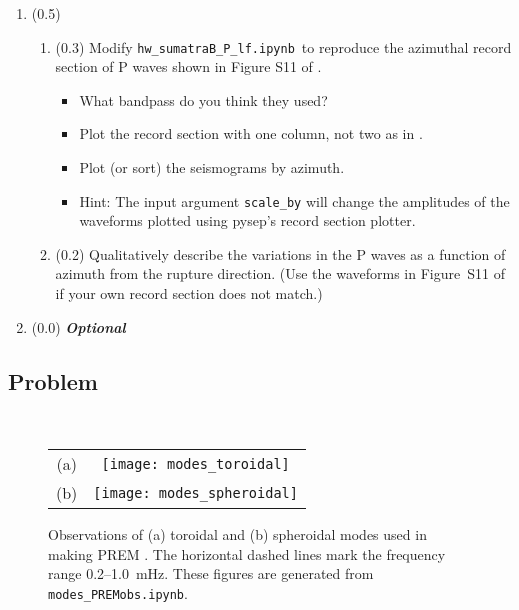 \documentclass[11pt,titlepage,fleqn]{article}
\newcommand{\tfileplf}{{\tt hw\_sumatraB\_P\_lf.ipynb}}
\begin{document}
\begin{enumerate}
\pagebreak
\item (0.5) \ptag\
%
\begin{enumerate}
\item (0.3) Modify \tfileplf\ to reproduce the azimuthal record section of P waves shown in Figure S11 of \citet{Ammon2005}.
%
\begin{itemize}
\item What bandpass do you think they used?
\item Plot the record section with one column, not two as in \citet{Ammon2005}.
\item Plot (or sort) the seismograms by azimuth.
\item Hint: The input argument \verb+scale_by+ will change the amplitudes of the waveforms plotted using pysep's record section plotter.
\end{itemize}

\item (0.2) Qualitatively describe the variations in the P waves as a function of azimuth from the rupture direction. (Use the waveforms in Figure~S11 of \citet{Ammon2005} if your own record section does not match.)
\end{enumerate}


\item (0.0) {\bf\em Optional} 

\end{enumerate}


\subsection*{Problem} \howmuchtime\

\pagebreak


\clearpage\pagebreak


\clearpage\pagebreak
\begin{figure}
\centering
\begin{tabular}{cc}
(a) & \texttt{[image: modes\_toroidal]} \\
(b) & \texttt{[image: modes\_spheroidal]}
\end{tabular}
\caption[]
{{
Observations of (a) toroidal and (b) spheroidal modes used in making PREM \citep{PREM}.
The horizontal dashed lines mark the frequency range 0.2--1.0~mHz.
These figures are generated from {\tt modes\_PREMobs.ipynb}.
}}
\label{fig:premmodes}
\end{figure}
\end{document}
